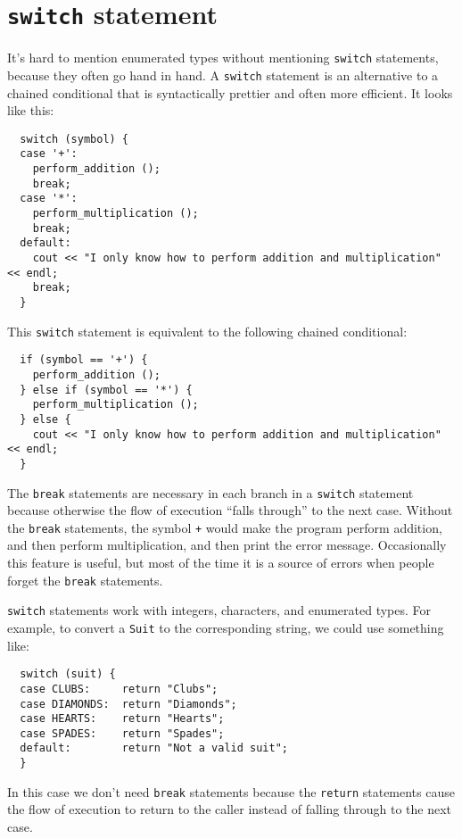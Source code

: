 \section{{\tt switch} statement}

It's hard to mention enumerated types without mentioning {\tt switch}
statements, because they often go hand in hand.  A {\tt switch} statement
is an alternative to a chained conditional that is syntactically
prettier and often more efficient.  It looks like this:

\begin{verbatim}
  switch (symbol) {
  case '+':
    perform_addition ();
    break;
  case '*':
    perform_multiplication ();
    break;
  default:
    cout << "I only know how to perform addition and multiplication" << endl;
    break;
  }
\end{verbatim}
%
This {\tt switch} statement is equivalent to the following chained
conditional:

\begin{verbatim}
  if (symbol == '+') {
    perform_addition ();
  } else if (symbol == '*') {
    perform_multiplication ();
  } else {
    cout << "I only know how to perform addition and multiplication" << endl;
  }
\end{verbatim}
%
The {\tt break} statements are necessary in each branch
in a {\tt switch} statement because otherwise the flow of execution
``falls through'' to the next case.  Without the {\tt break} statements,
the symbol {\tt +} would make the program perform addition, and
then perform multiplication, and then print the error message.
Occasionally this feature is useful, but most of the time it is
a source of errors when people forget the {\tt break} statements.


{\tt switch} statements work with integers, characters, and enumerated
\mbox{types}.  For example, to convert a {\tt Suit} to the corresponding
string, we could use something like:

\begin{verbatim}
  switch (suit) {
  case CLUBS:     return "Clubs";
  case DIAMONDS:  return "Diamonds";
  case HEARTS:    return "Hearts";
  case SPADES:    return "Spades";
  default:        return "Not a valid suit";
  }
\end{verbatim}
%
In this case we don't need {\tt break} statements because the
{\tt return} statements cause the flow of execution to return to
the caller instead of falling through to the next case.

